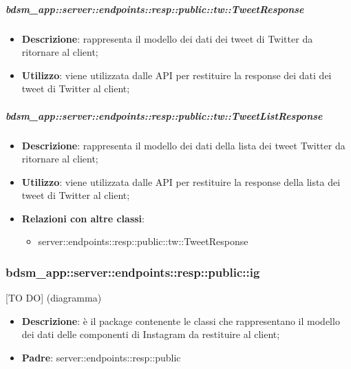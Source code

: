     \subparagraph{bdsm\_app::server::endpoints::resp::public::tw::TweetResponse} %
    \label{subp:bdsm_app_server_endpoints_resp_public_tw_tweetresponse}
    \begin{itemize}
      \item \textbf{Descrizione}: rappresenta il modello dei dati dei tweet di Twitter da ritornare al client;
      \item \textbf{Utilizzo}: viene utilizzata dalle API per restituire la response dei dati dei tweet di Twitter al client;
      \end{itemize}

    \subparagraph{bdsm\_app::server::endpoints::resp::public::tw::TweetListResponse} %
    \label{subp:bdsm_app_server_endpoints_resp_public_tw_tweetlistresponse}
    \begin{itemize}
      \item \textbf{Descrizione}: rappresenta il modello dei dati della lista dei tweet Twitter da ritornare al client;
      \item \textbf{Utilizzo}: viene utilizzata dalle API per restituire la response della lista dei tweet di Twitter al client;
      \item \textbf{Relazioni con altre classi}:
        \begin{itemize}
          \item server::endpoints::resp::public::tw::TweetResponse
        \end{itemize}
      \end{itemize}

\subsubsection{bdsm\_app::server::endpoints::resp::public::ig} %
\label{ssub:bdsm_app_server_endpoints_resp_public_ig}
[TO DO] (diagramma) \newline \newline

\begin{itemize}
  \item \textbf{Descrizione}: è il package contenente le classi che rappresentano il modello dei dati delle componenti di Instagram da restituire al client;
  \item \textbf{Padre}: server::endpoints::resp::public
\end{itemize}

